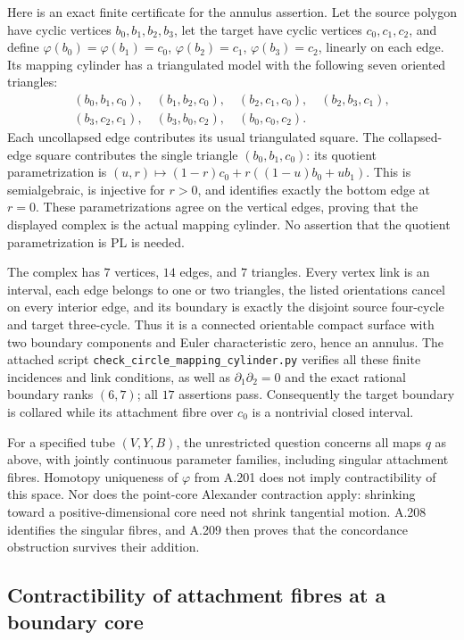 Here is an exact finite certificate for the annulus assertion.
Let the source polygon have cyclic vertices $b_0,b_1,b_2,b_3$,
let the target have cyclic vertices $c_0,c_1,c_2$, and define
$\varphi(b_0)=\varphi(b_1)=c_0$, $\varphi(b_2)=c_1$,
$\varphi(b_3)=c_2$, linearly on each edge. Its mapping cylinder
has a triangulated model with the following seven oriented
triangles:
\[
\begin{gathered}
(b_0,b_1,c_0),\quad (b_1,b_2,c_0),\quad
(b_2,c_1,c_0),\quad (b_2,b_3,c_1),\\
(b_3,c_2,c_1),\quad (b_3,b_0,c_2),\quad
(b_0,c_0,c_2).
\end{gathered}
\]
Each uncollapsed edge contributes its usual triangulated square.
The collapsed-edge square contributes the single triangle
$(b_0,b_1,c_0)$: its quotient parametrization is
$(u,r)\mapsto (1-r)c_0+r((1-u)b_0+ub_1)$.
This is semialgebraic, is injective for $r>0$, and identifies
exactly the bottom edge at $r=0$. These parametrizations agree
on the vertical edges, proving that the displayed complex is
the actual mapping cylinder. No assertion that the quotient
parametrization is PL is needed.

The complex has $7$ vertices, $14$ edges, and $7$ triangles.
Every vertex link is an interval, each edge belongs to one or
two triangles, the listed orientations cancel on every interior
edge, and its boundary is exactly the disjoint source four-cycle
and target three-cycle. Thus it is a connected orientable compact
surface with two boundary components and Euler characteristic
zero, hence an annulus. The attached script
\texttt{check\_circle\_mapping\_cylinder.py} verifies all these
finite incidences and link conditions, as well as
$\partial_1\partial_2=0$ and the exact rational boundary ranks
$(6,7)$; all $17$ assertions pass. Consequently the target
boundary is collared while its attachment fibre over $c_0$ is a
nontrivial closed interval.

For a specified tube $(V,Y,B)$, the unrestricted question concerns
all maps $q$ as above, with jointly continuous parameter families,
including singular attachment fibres. Homotopy uniqueness of
$\varphi$ from A.201 does not imply contractibility of this space.
Nor does the point-core Alexander contraction apply: shrinking toward
a positive-dimensional core need not shrink tangential motion.
A.208 identifies the singular fibres, and A.209 then proves that the
concordance obstruction survives their addition.

\subsection{Contractibility of attachment fibres at a boundary core}

